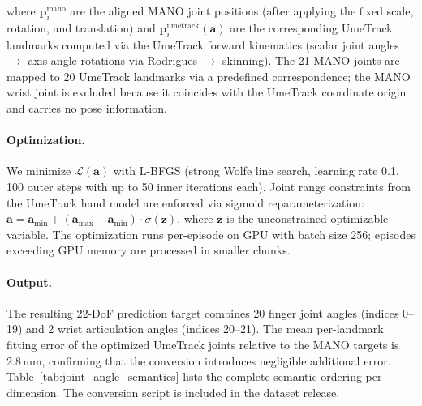 \documentclass{article}
\begin{document}
where $\mathbf{p}_i^{\text{mano}}$ are the aligned MANO joint positions (after applying the fixed scale, rotation, and translation) and $\mathbf{p}_i^{\text{umetrack}}(\mathbf{a})$ are the corresponding UmeTrack landmarks computed via the UmeTrack forward kinematics (scalar joint angles $\to$ axis-angle rotations via Rodrigues $\to$ skinning). The 21 MANO joints are mapped to 20 UmeTrack landmarks via a predefined correspondence; the MANO wrist joint is excluded because it coincides with the UmeTrack coordinate origin and carries no pose information.

\paragraph{Optimization.}
We minimize $\mathcal{L}(\mathbf{a})$ with L-BFGS (strong Wolfe line search, learning rate 0.1, 100 outer steps with up to 50 inner iterations each). Joint range constraints from the UmeTrack hand model are enforced via sigmoid reparameterization: $\mathbf{a} = \mathbf{a}_{\min} + (\mathbf{a}_{\max} - \mathbf{a}_{\min}) \cdot \sigma(\mathbf{z})$, where $\mathbf{z}$ is the unconstrained optimizable variable. The optimization runs per-episode on GPU with batch size 256; episodes exceeding GPU memory are processed in smaller chunks.

\paragraph{Output.}
The resulting 22-DoF prediction target combines 20 finger joint angles (indices 0--19) and 2 wrist articulation angles (indices 20--21). The mean per-landmark fitting error of the optimized UmeTrack joints relative to the MANO targets is 2.8\,mm, confirming that the conversion introduces negligible additional error. Table~\ref{tab:joint_angle_semantics} lists the complete semantic ordering per dimension. The conversion script is included in the dataset release.
\end{document}
